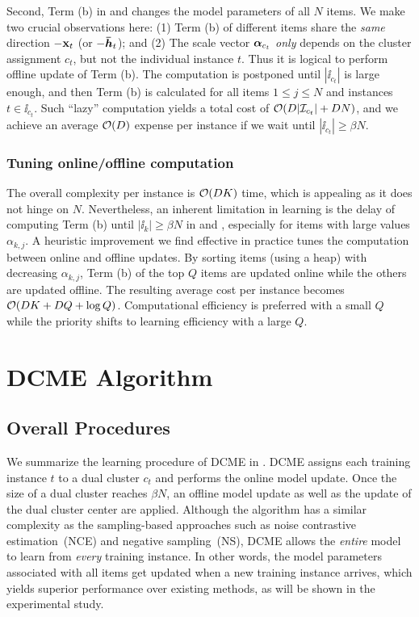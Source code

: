 Second, Term (b) in  and
 changes the model parameters of all $N$ items.
We make two crucial observations here: (1) Term (b) of different items share the
\emph{same} direction $-\mathbf{x}_t$ (or $-\boldsymbol{\bar{h}}_t$); and (2) The scale vector
$\boldsymbol{\alpha}_{c_t}$ \emph{only} depends on the cluster assignment $c_t$, but not the
individual instance $t$. Thus it is logical to perform offline update of Term
(b). The computation is postponed until $|\ii_{c_t}|$ is large enough, and then
Term (b) is calculated for all items $1 \le j \le N$ and instances $t \in
\ii_{c_t}$. Such ``lazy'' computation yields a total cost of $\mathcal{O}(D |\mathcal{I}_{c_t}|
+ D N)$, and we achieve an average $\mathcal{O}(D)$ expense per instance if we wait
until $|\ii_{c_t}| \ge \beta N$.

\subsubsection{Tuning online/offline computation}

The overall complexity per instance is $\mathcal{O}(DK)$ time, which is appealing as it
does not hinge on $N$.  Nevertheless, an inherent limitation in learning is the
delay of computing Term (b) until $|\ii_k| \ge \beta N$ in
 and  ,
especially for items with large values $\alpha_{k, j}$. A heuristic improvement
we find effective in practice tunes the computation between online and offline
updates. By sorting items (using a heap) with decreasing $\alpha_{k,j}$, Term
(b) of the top $Q$ items are updated online while the others are updated
offline. The resulting average cost per instance becomes $\mathcal{O}(D K + D Q + \log
Q)$. Computational efficiency is preferred with a small $Q$ while the priority
shifts to learning efficiency with a large $Q$.

\section{DCME Algorithm}\label{sec::dcme_algo}

\subsection{Overall Procedures}

We summarize the learning procedure of DCME in . DCME assigns
each training instance $t$ to a dual cluster $c_t$ and performs the online model
update. Once the size of a dual cluster reaches $\beta N$, an offline model
update as well as the update of the dual cluster center are applied.  Although
the algorithm has a similar complexity as the sampling-based approaches such as
noise contrastive estimation~(NCE) and negative sampling~(NS), DCME allows the
\emph{entire} model to learn from \emph{every} training instance. In other
words, the model parameters associated with all items get updated when a new
training instance arrives, which yields superior performance over existing
methods, as will be shown in the experimental study.

